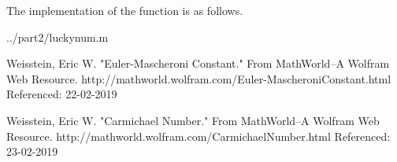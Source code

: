 \documentclass[10pt]{report}
\begin{document}
The implementation of the function is as follows.

   {../part2/luckynum.m}


\begin{thebibliography}{9}
Weisstein, Eric W. "Euler-Mascheroni Constant." From MathWorld--A Wolfram Web Resource. http://mathworld.wolfram.com/Euler-MascheroniConstant.html
Referenced: 22-02-2019

Weisstein, Eric W. "Carmichael Number." From MathWorld--A Wolfram Web Resource. http://mathworld.wolfram.com/CarmichaelNumber.html
Referenced: 23-02-2019

\end{thebibliography}
\end{document}
